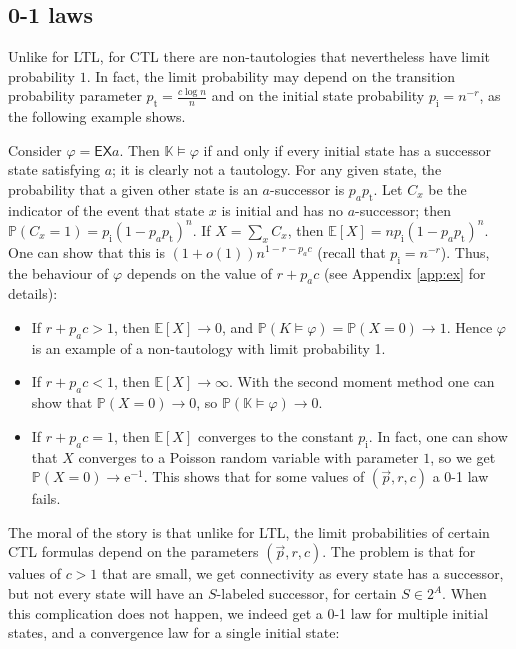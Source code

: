 \documentclass[runngingheads]{llncs}
\newcommand\recht\operatorname
\begin{document}
\subsection{0-1 laws}

Unlike for LTL, for CTL there are non-tautologies that nevertheless have limit probability $1$. In fact, the limit probability may depend on the transition probability parameter $p_{\recht{t}} = \tfrac{c \log n}{n}$ and on the initial state probability $p_{\recht{i}} = n^{-r}$, as the following example shows.

\begin{example} \label{ex:ctl}
Consider $\varphi = \mathsf{EX}a$. Then $\mathbb{K} \models \varphi$ if and only if every initial state has a successor state satisfying $a$; it is clearly not a tautology. For any given state, the probability that a given other state is an $a$-successor is $p_ap_{\recht{t}}$. Let $C_x$ be the indicator of the event that state $x$ is initial and has no $a$-successor; then $\mathbb{P}(C_x = 1) = p_{\recht{i}}(1-p_ap_{\recht{t}})^n$. If $X = \sum_x C_x$, then $\mathbb{E}[X] = np_{\recht{i}}(1-p_ap_{\recht{t}})^n$. One can show that this is $(1+o(1))n^{1-r-p_ac}$ (recall that $p_{\recht{i}} = n^{-r}$). Thus, the behaviour of $\varphi$ depends on the value of $r+p_ac$ (see Appendix \ref{app:ex} for details):
\begin{itemize}
\item If $r+p_ac > 1$, then $\mathbb{E}[X] \rightarrow 0$, and $\mathbb{P}(K \models \varphi) = \mathbb{P}(X = 0) \rightarrow 1$. Hence $\varphi$ is an example of a non-tautology with limit probability 1.
\item If $r+p_ac < 1$, then $\mathbb{E}[X] \rightarrow \infty$. With the second moment method one can show that $\mathbb{P}(X= 0) \rightarrow 0$, so $\mathbb{P}(\mathbb{K} \models \varphi) \rightarrow 0$.
\item If $r+p_ac = 1$, then $\mathbb{E}[X]$ converges to the constant $p_{\recht{i}}$. In fact, one can show that $X$ converges to a Poisson random variable with parameter $1$, so we get $\mathbb{P}(X = 0) \rightarrow \textrm{e}^{-1}$. This shows that for some values of $(\vec{p},r,c)$ a 0-1 law fails.
\end{itemize}
\end{example}

The moral of the story is that unlike for LTL, the limit probabilities of certain CTL formulas depend on the parameters $(\vec{p},r,c)$. The problem is that for values of $c > 1$ that are small, we get connectivity as every state has a successor, but not every state will have an $S$-labeled successor, for certain $S \in 2^A$. When this complication does not happen, we indeed get a 0-1 law for multiple initial states, and a convergence law for a single initial state:
\end{document}
